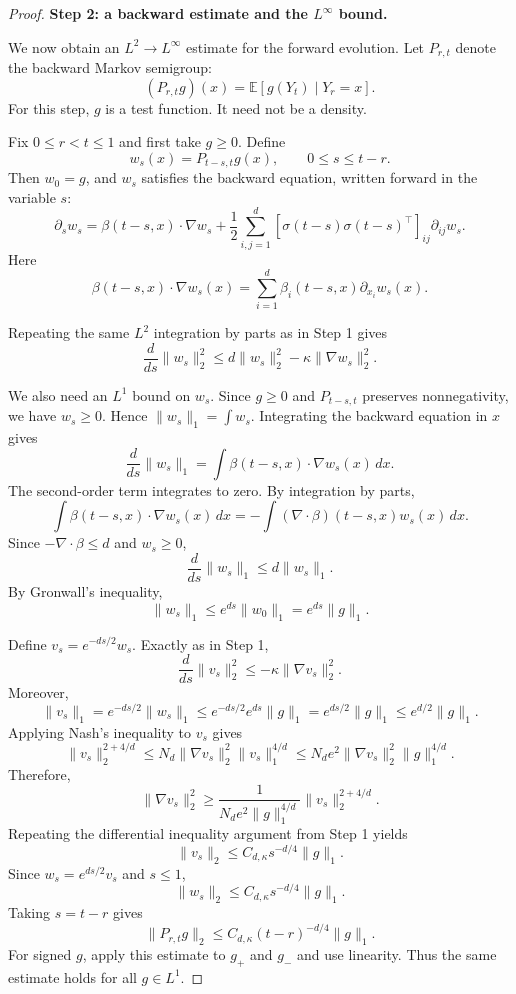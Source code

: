 \documentclass{article}
\newcommand{\1}{\mathbbm{1}}
\numberwithin{equation}{section}
\def\to{\rightarrow}
\begin{document}
\begin{proof}
\medskip

\textbf{Step 2: a backward estimate and the $L^\infty$ bound.}

We now obtain an $L^2\to L^\infty$ estimate for the forward evolution.
Let $P_{r,t}$ denote the backward Markov semigroup:
$$
(P_{r,t}g)(x)=\mathbb E[g(Y_t)\mid Y_r=x].
$$
For this step, $g$ is a test function. It need not be a density.

Fix $0\le r<t\le 1$ and first take $g\ge 0$. Define
$$
w_s(x)=P_{t-s,t}g(x),
\qquad
0\le s\le t-r .
$$
Then $w_0=g$, and $w_s$ satisfies the backward equation, written forward in
the variable $s$:
$$
\partial_s w_s
=
\beta(t-s,x)\cdot\nabla w_s
+
\frac12\sum_{i,j=1}^d
[\sigma(t-s)\sigma(t-s)^\top]_{ij}\partial_{ij}w_s .
$$
Here
$$
\beta(t-s,x)\cdot\nabla w_s(x)
=
\sum_{i=1}^d \beta_i(t-s,x)\partial_{x_i}w_s(x).
$$

Repeating the same $L^2$ integration by parts as in Step 1 gives
$$
\frac{d}{ds}\|w_s\|_2^2
\le
d\|w_s\|_2^2-\kappa\|\nabla w_s\|_2^2 .
$$

We also need an $L^1$ bound on $w_s$. Since $g\ge0$ and $P_{t-s,t}$ preserves
nonnegativity, we have $w_s\ge0$. Hence $\|w_s\|_1=\int w_s$. Integrating the
backward equation in $x$ gives
$$
\frac{d}{ds}\|w_s\|_1
=
\int \beta(t-s,x)\cdot\nabla w_s(x)\,dx .
$$
The second-order term integrates to zero. By integration by parts,
$$
\int \beta(t-s,x)\cdot\nabla w_s(x)\,dx
=
-\int(\nabla\cdot\beta)(t-s,x)w_s(x)\,dx .
$$
Since $-\nabla\cdot\beta\le d$ and $w_s\ge0$,
$$
\frac{d}{ds}\|w_s\|_1
\le
d\|w_s\|_1 .
$$
By Gronwall's inequality,
$$
\|w_s\|_1\le e^{ds}\|w_0\|_1=e^{ds}\|g\|_1 .
$$

Define $v_s=e^{-ds/2}w_s$. Exactly as in Step 1,
$$
\frac{d}{ds}\|v_s\|_2^2
\le
-\kappa\|\nabla v_s\|_2^2 .
$$
Moreover,
$$
\|v_s\|_1
=
e^{-ds/2}\|w_s\|_1
\le
e^{-ds/2}e^{ds}\|g\|_1
=
e^{ds/2}\|g\|_1
\le
e^{d/2}\|g\|_1 .
$$
Applying Nash's inequality to $v_s$ gives
$$
\|v_s\|_2^{2+4/d}
\le
N_d\|\nabla v_s\|_2^2\|v_s\|_1^{4/d}
\le
N_d e^2 \|\nabla v_s\|_2^2\|g\|_1^{4/d}.
$$
Therefore,
$$
\|\nabla v_s\|_2^2
\ge
\frac{1}{N_d e^2\|g\|_1^{4/d}}\|v_s\|_2^{2+4/d}.
$$
Repeating the differential inequality argument from Step 1 yields
$$
\|v_s\|_2
\le
C_{d,\kappa}s^{-d/4}\|g\|_1 .
$$
Since $w_s=e^{ds/2}v_s$ and $s\le1$,
$$
\|w_s\|_2
\le
C_{d,\kappa}s^{-d/4}\|g\|_1 .
$$
Taking $s=t-r$ gives
$$
\|P_{r,t}g\|_2
\le
C_{d,\kappa}(t-r)^{-d/4}\|g\|_1 .
$$
For signed $g$, apply this estimate to $g_+$ and $g_-$ and use linearity.
Thus the same estimate holds for all $g\in L^1$.


\end{proof}
\end{document}
